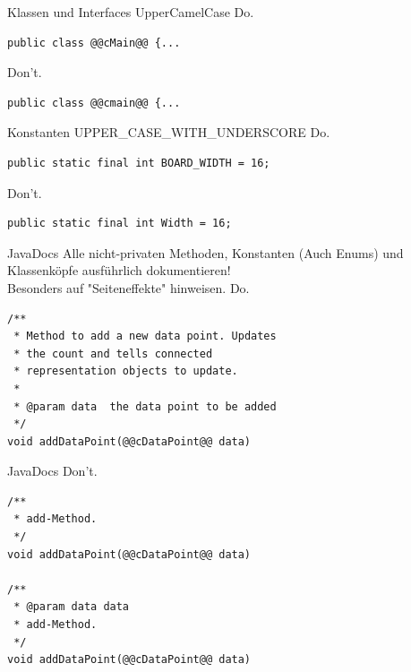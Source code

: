 \documentclass[aspectratio=169]{beamer}
\begin{document}
\begin{frame}[fragile]
  \begin{block}{Klassen und Interfaces}
    UpperCamelCase \linebreak
    \pause
    \color{nicegreen}Do.\color{FGround}
    \begin{lstlisting}[numbers=none]
public class @@cMain@@ {...
    \end{lstlisting}
    \pause
    \color{alertcolor}Don't.\color{FGround}
    \begin{lstlisting}[numbers=none]
public class @@cmain@@ {...
    \end{lstlisting}
  \end{block}

  \begin{block}{Konstanten}
    UPPER_CASE_WITH_UNDERSCORE \linebreak
    \pause
    \color{nicegreen}Do.\color{FGround}
    \begin{lstlisting}[numbers=none]
public static final int BOARD_WIDTH = 16;
    \end{lstlisting}
    \pause
    \color{alertcolor}Don't.\color{FGround}
    \begin{lstlisting}[numbers=none]
public static final int Width = 16;
    \end{lstlisting}
  \end{block}
\end{frame}

\begin{frame}[fragile]
  \begin{block}{JavaDocs}
    Alle nicht-privaten Methoden, Konstanten (Auch Enums) und Klassenköpfe ausführlich dokumentieren! \\
    Besonders auf "Seiteneffekte" hinweisen. \linebreak
    \pause
    \color{nicegreen}Do.\color{FGround}
    \begin{lstlisting}[numbers=none]
/** 
 * Method to add a new data point. Updates 
 * the count and tells connected  
 * representation objects to update. 
 *
 * @param data  the data point to be added 
 */ 
void addDataPoint(@@cDataPoint@@ data) 
    \end{lstlisting}
  \end{block}
\end{frame}

\begin{frame}[fragile]
  \begin{block}{JavaDocs}
    \pause
    \color{alertcolor}Don't.\color{FGround}
    \begin{lstlisting}[numbers=none]
/** 
 * add-Method.  
 */ 
void addDataPoint(@@cDataPoint@@ data)

/** 
 * @param data data
 * add-Method.  
 */ 
void addDataPoint(@@cDataPoint@@ data)
    \end{lstlisting}
  \end{block}
\end{frame}
\end{document}
